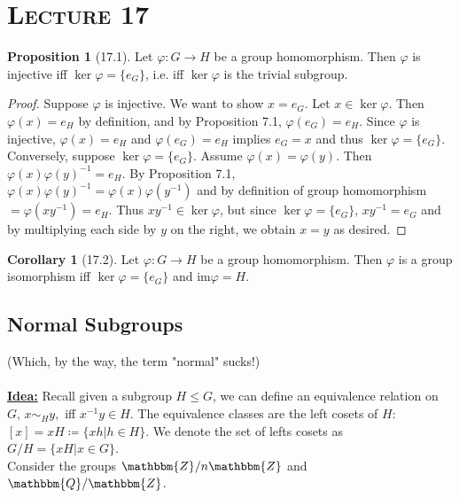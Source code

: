 \documentclass{article}
\newcommand{\Z}{\mathbbm{Z}}
\newcommand{\Q}{\mathbbm{Q}}
\newcommand{\coleq}{\coloneqq}
\newcommand{\inverse}[1]{#1^{-1}}
\newcommand{\define}[1]{\textbf{\underline{#1}}}
\newcommand{\func}[3]{#1: #2 \to #3}
\theoremstyle{definition}
\newtheorem*{cor}{Corollary}
\newtheorem*{prop}{Proposition}
\theoremstyle{remark}
\newcommand{\im}{\mathrm{im}}
\begin{document}
    \section*{\textbf{\textsc{Lecture 17}}}{
        \begin{prop}[17.1]
            Let $\func{\varphi}{G}{H}$ be a group homomorphism. Then $\varphi$ is injective iff $\ker\varphi=\{e_G\}$, i.e. iff $\ker\varphi$ is the trivial subgroup.
        \end{prop}
            \begin{proof}
                Suppose $\varphi$ is injective. We want to show $x=e_G$. Let $x\in \ker \varphi$. Then $\varphi(x)=e_H$ by definition, and by Proposition 7.1, $\varphi(e_G)=e_H$. Since $\varphi$ is injective, $\varphi(x)=e_H$ and $\varphi(e_G)=e_H$ implies $e_G=x$ and thus $\ker\varphi=\{e_G\}$.\\
                Conversely, suppose $\ker\varphi=\{e_G\}$. Assume $\varphi(x)=\varphi(y)$. Then $\varphi(x)\inverse{\varphi(y)}=e_H$. By Proposition 7.1, \\$\varphi(x)\inverse{\varphi(y)}=\varphi(x)\varphi(\inverse{y})$ and by definition of group homomorphism $=\varphi(x\inverse{y})=e_H$. Thus $x\inverse{y} \in \ker\varphi$, but since $\ker\varphi=\{e_G\}$, $x\inverse{y}=e_G$ and by multiplying each side by $y$ on the right, we obtain $x=y$ as desired.
            \end{proof}
            
        \begin{cor}[17.2]
            Let $\func{\varphi}{G}{H}$ be a group homomorphism. Then $\varphi$ is a group isomorphism iff $\ker\varphi=\{e_G\}$ and $\im\varphi=H$.
        \end{cor}
        
        \subsection*{Normal Subgroups}{
            (Which, by the way, the term "normal" sucks!)\\\\
            \define{Idea:} Recall given a subgroup $H\leq G$, we can define an equivalence relation on $G, \, x\sim_H y,$ iff $\inverse{x}y \in H$. The equivalence classes are the left cosets of $H$: $[x]=xH\coleq\{xh|h \in H\}$. We denote the set of lefts cosets as $G/H=\{xH|x \in G\}$.\\
            Consider the groups $\Z/n\Z$ and $\Q/\Z$.
            
}}
\end{document}
